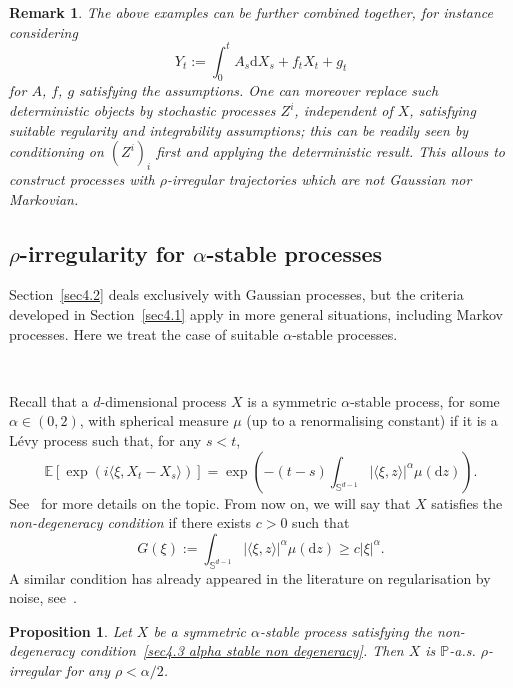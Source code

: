 \documentclass[10pt]{article}
\newcommand{\assign}{:=}
\newcommand{\mathd}{\mathrm{d}}
\newcommand{\tmtextit}[1]{{\itshape{#1}}}
\newtheorem{proposition}[theorem]{Proposition}
\newtheorem{remark}[theorem]{Remark}
\begin{document}
\begin{remark}
  The above examples can be further combined together, for instance
  considering
  \[ Y_t \assign \int_0^t A_s \mathd X_s + f_t X_t + g_t \]
  for $A$, $f$, $g$ satisfying the assumptions. One can moreover replace such
  deterministic objects by stochastic processes $Z^i$, independent of $X$,
  satisfying suitable regularity and integrability assumptions; this can be
  readily seen by conditioning on $(Z^i)_i$ first and applying the
  deterministic result. This allows to construct processes with
  $\rho$-irregular trajectories which are not Gaussian nor Markovian.
\end{remark}

\subsection{$\rho$\mbox{-}irregularity for $\alpha$\mbox{-}stable
processes}\label{sec4.3}

Section~\ref{sec4.2} deals exclusively with Gaussian processes, but the
criteria developed in Section~\ref{sec4.1} apply in more general situations,
including Markov processes. Here we treat the case of suitable
$\alpha$\mbox{-}stable processes.

\

Recall that a $d$-dimensional process $X$ is a symmetric $\alpha$-stable process, for some $\alpha\in (0,2)$,
with spherical measure $\mu$ (up to a renormalising constant) if it is a
L{\'e}vy process such that, for any $s < t$,
\[ \mathbb{E} [\exp (i \langle \xi, X_t - X_s \rangle)] = \exp \left( - (t -
   s) \int_{\mathbb{S}^{d - 1}} | \langle \xi, z \rangle |^{\alpha} \mu
   (\mathd z) \right) . \]
See~{\cite{sato}} for more details on the topic. From now on, we will say that
$X$ satisfies the \tmtextit{non\mbox{-}degeneracy condition} if there exists
$c > 0$ such that
\begin{equation}
  G (\xi) \assign \int_{\mathbb{S}^{d - 1}} | \langle \xi, z \rangle
  |^{\alpha} \mu (\mathd z) \geqslant c | \xi |^{\alpha} . \label{sec4.3 alpha
  stable non degeneracy}
\end{equation}
A similar condition has already appeared in the literature on regularisation
by noise, see~{\cite{priola2020}}.

\begin{proposition}
  \label{sec4.3 prop rho irr alpha}Let $X$ be a symmetric $\alpha$-stable
  process satisfying the non\mbox{-}degeneracy condition~\eqref{sec4.3 alpha
  stable non degeneracy}. Then $X$ is $\mathbb{P}$-a.s. $\rho$-irregular for
  any $\rho < \alpha / 2$.
\end{proposition}
\end{document}
